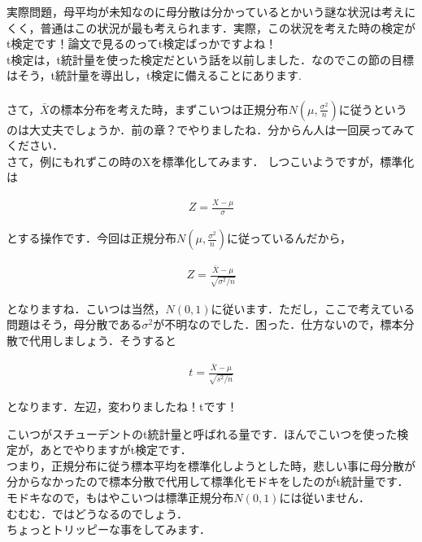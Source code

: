 \documentclass[11pt,a4paper,uplatex]{ujreport} 	%
\begin{document}
実際問題，母平均が未知なのに母分散は分かっているとかいう謎な状況は考えにくく，普通はこの状況が最も考えられます．実際，この状況を考えた時の検定がt検定です！論文で見るのってt検定ばっかですよね！\\

t検定は，t統計量を使った検定だという話を以前しました．なのでこの節の目標はそう，t統計量を導出し，t検定に備えることにあります.\\\\

さて，$\bar{X}$の標本分布を考えた時，まずこいつは正規分布$N(\mu, \frac{\sigma^2}{n})$に従うというのは大丈夫でしょうか．前の章？でやりましたね．分からん人は一回戻ってみてください．\\

さて，例にもれずこの時のXを標準化してみます．
しつこいようですが，標準化は

\begin{align}
  Z = \frac{X-\mu}{\sigma}
\end{align}

とする操作です．今回は正規分布$N(\mu, \frac{\sigma^2}{n})$に従っているんだから，

\begin{align}
  Z = \frac{\bar{X} - \mu}{\sqrt{\sigma^2/n}}
\end{align}

となりますね．こいつは当然，$N(0,1)$に従います．ただし，ここで考えている問題はそう，母分散である$\sigma^2$が不明なのでした．困った．仕方ないので，標本分散で代用しましょう．そうすると

\begin{align}
  t = \frac{\bar{X}- \mu}{\sqrt{s^2/n}}
  \label{eq:t-value}
\end{align}

となります．左辺，変わりましたね！tです！

こいつがスチューデントのt統計量と呼ばれる量です．ほんでこいつを使った検定が，あとでやりますがt検定です．\\

つまり，正規分布に従う標本平均を標準化しようとした時，悲しい事に母分散が分からなかったので標本分散で代用して標準化モドキをしたのがt統計量です．\\

モドキなので，もはやこいつは標準正規分布$N(0,1)$には従いません．\\

むむむ．ではどうなるのでしょう．\\

ちょっとトリッピーな事をしてみます．
\end{document}
